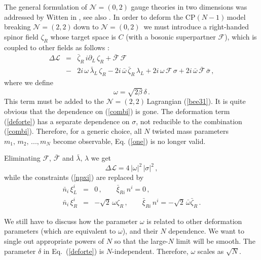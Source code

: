 \documentclass[epsfig,12pt]{article}
\def\beq{\begin{equation}}
\def\eeq{\end{equation}}
\def\beqn{\begin{eqnarray}}
\def\eeqn{\end{eqnarray}}
\newcommand{\ntt}{${\mathcal N}=(2,2)\,$}
\newcommand{\nzt}{${\mathcal N}=(0,2)\,$}
\newcommand{\cpn}{CP$(N-1)\,$}
\newcommand{\cell}{{\mathcal L}}
\newcommand{\pt}{\partial}
\newcommand{\cf}{${\mathcal F}$}
\newcommand{\cfe}{{\mathcal F}}
\def\beqn{\begin{eqnarray}}
\def\eeqn{\end{eqnarray}}
\def\beq{\begin{equation}}
\def\eeq{\end{equation}}
\newcommand{\ntwoo}{${\mathcal N}= \left(0,2\right) $ }
\begin{document}
The general formulation of \ntwoo gauge theories in two dimensions was addressed by Witten in 
\cite{W93}, see also \cite{Witten:2005px}.
In order to deform the \cpn model breaking \ntt down to \mbox{\nzt}
we must introduce a right-handed spinor field $\zeta_R$ whose  target space is $C$ 
(with a bosonic superpartner \cf), which is coupled to other fields as follows
\cite{EdTo,SY1}:
\beqn
\Delta\cell 
&=&
\bar\zeta_R\, i\pt_L\, \zeta_R   +\bar\cfe\,\cfe
	\nonumber\\[2mm]
&-&
 2i\, \omega \, \bar\lambda_L\, \zeta_R -  2i\, \bar{\omega} \, \bar\zeta_R\, \lambda_L +
	 2i\, \omega \, \cfe\, \sigma +
 2i\, \bar{\omega} \, \bar\cfe\, \bar{\sigma}\,,
 \label{deforte}
\eeqn
where we define
\beq
\omega = \sqrt{2\beta}\,\delta\,.
\label{deffp}
\eeq
This term must be added to the \ntt Lagrangian (\ref{bee31}). 
It is quite obvious that the dependence on (\ref{combi}) is gone. 
The deformation term (\ref{deforte}) has a separate dependence on $\sigma$, not reducible to the
combination (\ref{combi}). Therefore, for a generic choice, all $N$ twisted mass
parameters $m_1,\,m_2,\, ..., m_N$ become observable, Eq. (\ref{one}) is no longer valid.

\vspace{1mm}

Eliminating \cf, $\bar\cfe$  and $\bar\lambda ,\,\lambda$ we get
\beq
\Delta\cell = 4\, |\omega |^2\,|\sigma |^2\,,
\label{deffpp}
\eeq
while the constraints (\ref{npxi}) are replaced by
\beqn
\bar{n}_i\,\xi^i_L
&= &
0\,,\qquad \bar\xi_{Ri}\,n^i = 0\,,
\nonumber\\[2mm]
\bar{n}_i\,\xi^i_R
&= &
 -\sqrt{2}\,\omega\zeta_R\,,\qquad \bar\xi_{Ri}\,n^i =  -\sqrt{2}\,\bar\omega\bar\zeta_R\,.
\label{npxip}
\eeqn

We still have to discuss how the parameter $\omega$ is related to other
deformation parameters (which are equivalent to $\omega$), and their $N$ dependence.
We want to single out appropriate powers of $N$ so that the large-$N$ limit will be smooth.
The parameter $\delta$ in Eq.~(\ref{deforte}) is $N$-independent. Therefore, $\omega$ scales as
$\sqrt N$.
\end{document}
